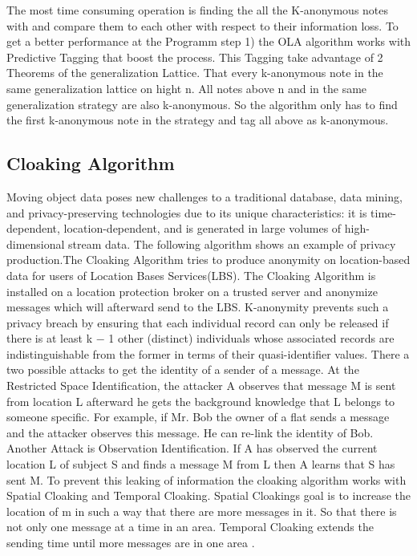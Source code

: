 \documentclass{llncs}
\begin{document}
The most time consuming operation is finding the all the K-anonymous notes with and compare them to each other with respect to their information loss.  To get a better performance at the Programm step 1) the OLA algorithm works with Predictive Tagging that boost the process.  This Tagging take advantage of 2 Theorems of the generalization Lattice. That every k-anonymous note in the same generalization lattice on hight n. All notes above n and in the same generalization strategy are also k-anonymous. So the algorithm only has to find the first k-anonymous note in the strategy and tag all above as k-anonymous.   

\subsection{Cloaking Algorithm}
Moving object data poses new challenges to a traditional database, data mining, and privacy-preserving technologies due to its unique characteristics: it is time-dependent, location-dependent, and is generated in large volumes of high-dimensional stream data. The following algorithm shows an example of privacy production.The Cloaking Algorithm tries to produce anonymity on location-based data for users of Location Bases Services(LBS). The Cloaking Algorithm is installed on a location protection broker on a trusted server and anonymize messages which will afterward send to the LBS. K-anonymity prevents such a privacy breach by ensuring that each individual record can only be released if there is at least k − 1 other (distinct) individuals whose associated records are indistinguishable from the former in terms of their quasi-identifier values. There a two possible attacks to get the identity of a sender of a message. At the  Restricted Space Identification, the attacker A observes that message M is sent from location L afterward he gets the background knowledge that L belongs to someone specific. For example, if Mr. Bob the owner of a flat sends a message and the attacker observes this message. He can re-link the identity of Bob. Another Attack is  Observation Identiﬁcation. If A has observed the current location L of subject S and ﬁnds a message M from L then A learns that S has sent M.  To prevent this leaking of information the cloaking algorithm works with Spatial Cloaking and Temporal Cloaking. Spatial Cloakings goal is to increase the location of m in such a way that there are more messages in it. So that there is not only one message at a time in an area. Temporal Cloaking extends the sending time until more messages are in one area \cite{gedik2004customizable}. 
\end{document}
